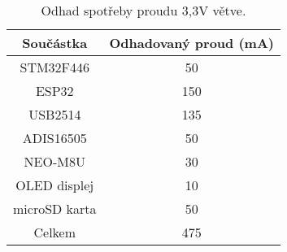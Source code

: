 \begin{table}[h!]
\caption{Odhad spotřeby proudu 3,3V větve.} 
\centering

\begin{tabular}{|c|c|}
\hline 
Součástka & Odhadovaný proud (mA) \\ 
\hline 
\hline 
STM32F446 & 50 \\ 
\hline 
ESP32 & 150 \\ 
\hline 
USB2514 & 135 \\ 
\hline 
ADIS16505 & 50 \\ 
\hline 
NEO-M8U & 30 \\ 
\hline 
OLED displej & 10 \\ 
\hline 
microSD karta & 50 \\ 
\hline 
\hline 
Celkem & 475 \\ 
\hline 
\end{tabular} 


\label{table:currentConsumption}
\end{table} 